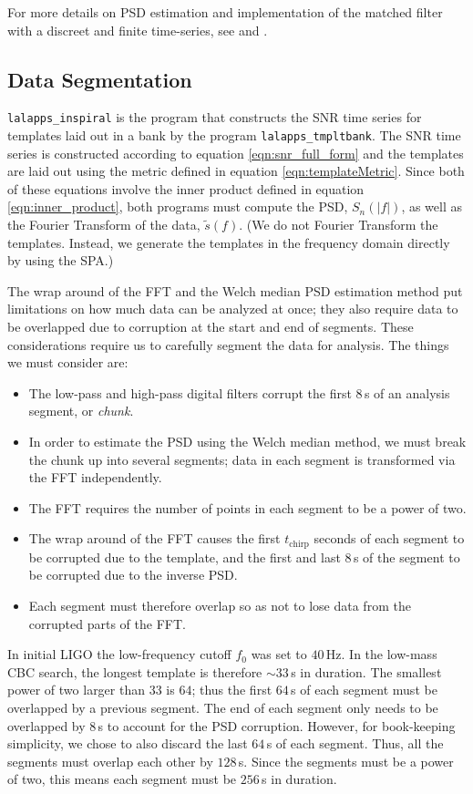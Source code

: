 For more details on \ac{PSD} estimation and implementation of the matched filter with a discreet and finite time-series, see \cite{ref:Brown} and \cite{ref:FindChirp}.

\subsection{Data Segmentation}
\label{sec:data_segmentation}

\texttt{lalapps\_inspiral} is the program that constructs the \ac{SNR} time series for templates laid out in a bank by the program \texttt{lalapps\_tmpltbank}. The \ac{SNR} time series is constructed according to equation \ref{eqn:snr_full_form} and the templates are laid out using the metric defined in equation \ref{eqn:templateMetric}. Since both of these equations involve the inner product defined in equation \ref{eqn:inner_product}, both programs must compute the \ac{PSD}, $S_n(|f|)$, as well as the Fourier Transform of the data, $\widetilde{s}(f)$. (We do not Fourier Transform the templates. Instead, we generate the templates in the frequency domain directly by using the \ac{SPA}.)

The wrap around of the \ac{FFT} and the Welch median \ac{PSD} estimation method put limitations on how much data can be analyzed at once; they also require data to be overlapped due to corruption at the start and end of segments. These considerations require us to carefully segment the data for analysis. The things we must consider are:
\begin{itemize}
\item{The low-pass and high-pass digital filters corrupt the first $8\,$s of an analysis segment, or \emph{chunk}.}
\item{In order to estimate the \ac{PSD} using the Welch median method, we must break the chunk up into several segments; data in each segment is transformed via the \ac{FFT} independently.}
\item{The \ac{FFT} requires the number of points in each segment to be a power of two.}
\item{The wrap around of the \ac{FFT} causes the first $t_{\mathrm{chirp}}$ seconds of each segment to be corrupted due to the template, and the first and last $8\,$s of the segment to be corrupted due to the inverse \ac{PSD}.}
\item{Each segment must therefore overlap so as not to lose data from the corrupted parts of the \ac{FFT}.}
\end{itemize}
In initial \ac{LIGO} the low-frequency cutoff $f_0$ was set to $40\,$Hz. In the low-mass \ac{CBC} search, the longest template is therefore $\sim33\,$s in duration. The smallest power of two larger than $33$ is $64$; thus the first $64\,$s of each segment must be overlapped by a previous segment. The end of each segment only needs to be overlapped by $8\,$s to account for the \ac{PSD} corruption. However, for book-keeping simplicity, we chose to also discard the last $64\,$s of each segment. Thus, all the segments must overlap each other by $128\,$s. Since the segments must be a power of two, this means each segment must be $256\,$s in duration.

